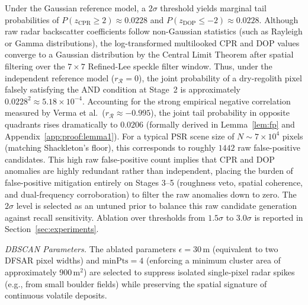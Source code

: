 \documentclass[10pt,conference]{IEEEtran}
\newcommand{\CPR}{\mathrm{CPR}}
\newcommand{\DOP}{\mathrm{DOP}}
\begin{document}
Under the Gaussian reference model, a $2\sigma$ threshold yields marginal tail probabilities of $P(z_{\CPR} \ge 2) \approx 0.0228$ and $P(z_{\DOP} \le -2) \approx 0.0228$. Although raw radar backscatter coefficients follow non-Gaussian statistics (such as Rayleigh or Gamma distributions), the log-transformed multilooked CPR and DOP values converge to a Gaussian distribution by the Central Limit Theorem after spatial filtering over the $7 \times 7$ Refined-Lee speckle filter window. Thus, under the independent reference model ($r_{\mathcal{R}} = 0$), the joint probability of a dry-regolith pixel falsely satisfying the AND condition at Stage~2 is approximately $0.0228^2 \approx 5.18 \times 10^{-4}$.
Accounting for the strong empirical negative correlation measured by Verma et al.\ ($r_{\mathcal{R}} \approx -0.995$), the joint tail probability in opposite quadrants rises dramatically to $0.0206$ (formally derived in Lemma~\ref{lem:fp} and Appendix~\ref{app:proof:lemma1}). For a typical PSR scene size of $N \sim 7 \times 10^4$ pixels (matching Shackleton's floor), this corresponds to roughly $1442$ raw false-positive candidates. This high raw false-positive count implies that CPR and DOP anomalies are highly redundant rather than independent, placing the burden of false-positive mitigation entirely on Stages 3--5 (roughness veto, spatial coherence, and dual-frequency corroboration) to filter the raw anomalies down to zero. The $2\sigma$ level is selected as an untuned prior to balance this raw candidate generation against recall sensitivity. Ablation over thresholds from $1.5\sigma$ to $3.0\sigma$ is reported in Section~\ref{sec:experiments}.

\textit{DBSCAN Parameters.}
The ablated parameters $\epsilon = 30$\,m (equivalent to two DFSAR pixel widths) and $\text{minPts} = 4$ (enforcing a minimum cluster area of approximately $900$\,m$^2$) are selected to suppress isolated single-pixel radar spikes (e.g., from small boulder fields) while preserving the spatial signature of continuous volatile deposits.
\end{document}
